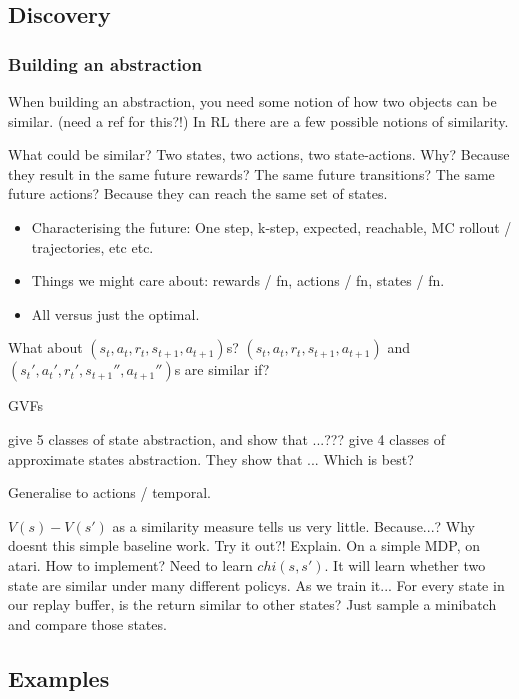 \subsection{Discovery}


\subsubsection{Building an abstraction}

When building an abstraction, you need some notion of how two objects can be similar. (need a ref for this?!)
In RL there are a few possible notions of similarity.

What could be similar? Two states, two actions, two state-actions. Why?
Because they result in the same future rewards? The same future transitions? The same future actions?
Because they can reach the same set of states.

\begin{itemize}
  \tightlist
  \item Characterising the future: One step, k-step, expected, reachable, MC rollout / trajectories, etc etc.
  \item Things we might care about: rewards / fn, actions / fn, states / fn.
  \item All versus just the optimal.
\end{itemize}

What about $(s_t, a_t, r_t, s_{t+1}, a_{t+1})$s? $(s_t, a_t, r_t, s_{t+1}, a_{t+1})$ and $(s_t', a_t', r_t', s_{t+1}'', a_{t+1}'')$s are similar if?

GVFs

\cite{Littman2006} give 5 classes of state abstraction, and show that ...???
\cite{Abel2017} give 4 classes of approximate states abstraction. They show that ...
Which is best?

Generalise to actions / temporal.

$V(s) - V(s')$ as a similarity measure tells us very little. Because...?
Why doesnt this simple baseline work. Try it out?! Explain.
On a simple MDP, on atari. How to implement? Need to learn $chi(s, s')$.
It will learn whether two state are similar under many different policys. As we train it...
For every state in our replay buffer, is the return similar to other states?
Just sample a minibatch and compare those states.


\subsection{Examples}

